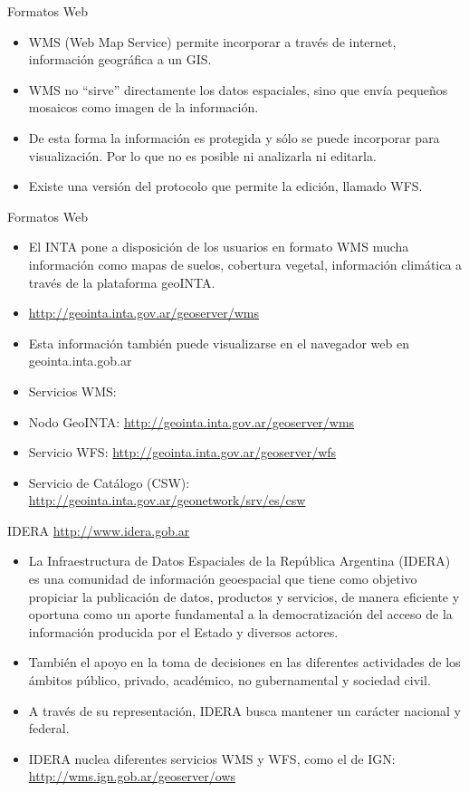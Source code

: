 \documentclass{beamer}
\begin{document}
\begin{frame}{Formatos Web}
	\begin{itemize}[<+->]
		\item WMS (Web Map Service) permite incorporar a través de internet, información geográfica a un GIS. 
		\item WMS no “sirve” directamente los datos espaciales, sino que envía pequeños mosaicos como imagen de la información.
		\item De esta forma la información es protegida y sólo se puede incorporar para visualización. Por lo que no es posible ni analizarla ni editarla.
		\item Existe una versión del protocolo que permite la edición, llamado WFS.  
	\end{itemize}
\end{frame}

\begin{frame}{Formatos Web}
	\begin{itemize}
		\item El INTA pone a disposición de los usuarios en formato WMS mucha información como mapas de suelos, cobertura vegetal, información climática a través de la plataforma geoINTA.
		\item \url{http://geointa.inta.gov.ar/geoserver/wms}
		\item Esta información también puede visualizarse en el navegador web en geointa.inta.gob.ar
		\item Servicios WMS:
		\item Nodo GeoINTA: \url{http://geointa.inta.gov.ar/geoserver/wms}
	    \item Servicio WFS: \url{http://geointa.inta.gov.ar/geoserver/wfs}
		\item Servicio de Catálogo (CSW): \url{http://geointa.inta.gov.ar/geonetwork/srv/es/csw}
	\end{itemize}
\end{frame}

\begin{frame}{IDERA \url{http://www.idera.gob.ar}}
	\begin{itemize}
		\item La Infraestructura de Datos Espaciales de la República Argentina (IDERA) es una comunidad de información geoespacial que tiene como objetivo propiciar la publicación de datos, productos y servicios, de manera eficiente y oportuna como un aporte fundamental a la democratización del acceso de la información producida por el Estado y diversos actores.
		\item También el apoyo en la toma de decisiones en las diferentes actividades de los ámbitos público, privado, académico, no gubernamental y sociedad civil. 
		\item A través de su representación, IDERA busca mantener un carácter nacional y federal.
		\item IDERA nuclea diferentes servicios WMS y WFS, como el de IGN: \url{http://wms.ign.gob.ar/geoserver/ows}
	\end{itemize}
	
\end{frame}
\end{document}
